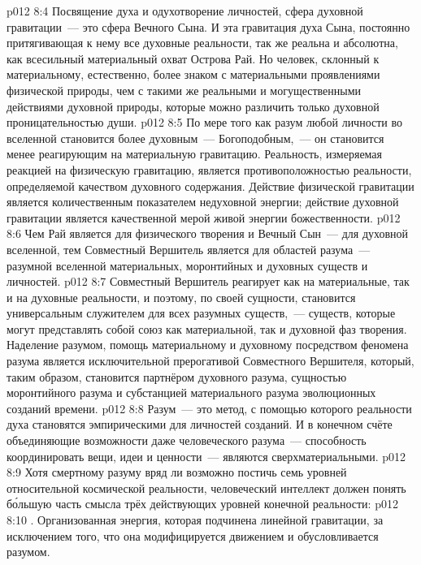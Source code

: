 \vs p012 8:4 \pc Посвящение духа и одухотворение личностей, сфера духовной гравитации~--- это сфера Вечного Сына. И эта гравитация духа Сына, постоянно притягивающая к нему все духовные реальности, так же реальна и абсолютна, как всесильный материальный охват Острова Рай. Но человек, склонный к материальному, естественно, более знаком с материальными проявлениями физической природы, чем с такими же реальными и могущественными действиями духовной природы, которые можно различить только духовной проницательностью души.
\vs p012 8:5 По мере того как разум любой личности во вселенной становится более духовным~--- Богоподобным,~--- он становится менее реагирующим на материальную гравитацию. Реальность, измеряемая реакцией на физическую гравитацию, является противоположностью реальности, определяемой качеством духовного содержания. Действие физической гравитации является количественным показателем недуховной энергии; действие духовной гравитации является качественной мерой живой энергии божественности.
\vs p012 8:6 \pc Чем Рай является для физического творения и Вечный Сын~--- для духовной вселенной, тем Совместный Вершитель является для областей разума~--- разумной вселенной материальных, моронтийных и духовных существ и личностей.
\vs p012 8:7 Совместный Вершитель реагирует как на материальные, так и на духовные реальности, и поэтому, по своей сущности, становится универсальным служителем для всех разумных существ,~--- существ, которые могут представлять собой союз как материальной, так и духовной фаз творения. Наделение разумом, помощь материальному и духовному посредством феномена разума является исключительной прерогативой Совместного Вершителя, который, таким образом, становится партнёром духовного разума, сущностью моронтийного разума и субстанцией материального разума эволюционных созданий времени.
\vs p012 8:8 Разум~--- это метод, с помощью которого реальности духа становятся эмпирическими для личностей созданий. И в конечном счёте объединяющие возможности даже человеческого разума~--- способность координировать вещи, идеи и ценности~--- являются сверхматериальными.
\vs p012 8:9 \pc Хотя смертному разуму вряд ли возможно постичь семь уровней относительной космической реальности, человеческий интеллект должен понять б\'ольшую часть смысла трёх действующих уровней конечной реальности:
\vs p012 8:10 . Организованная энергия, которая подчинена линейной гравитации, за исключением того, что она модифицируется движением и обусловливается разумом.
